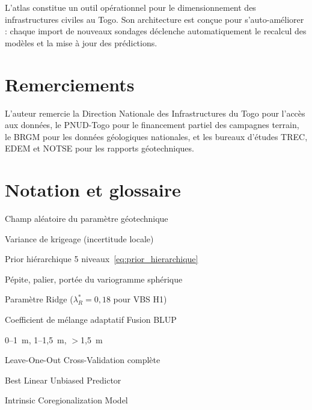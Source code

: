 \documentclass[10pt,a4paper,twocolumn]{article}
\newcommand{\bs}{\mathbf{s}}
\begin{document}
L'atlas constitue un outil opérationnel pour le dimensionnement des
infrastructures civiles au Togo. Son architecture est conçue pour
s'auto-améliorer : chaque import de nouveaux sondages déclenche
automatiquement le recalcul des modèles et la mise à jour des prédictions.

\section*{Remerciements}

L'auteur remercie la Direction Nationale des Infrastructures du Togo pour
l'accès aux données, le PNUD-Togo pour le financement partiel des campagnes
terrain, le BRGM pour les données géologiques nationales, et les bureaux
d'études TREC, EDEM et NOTSE pour les rapports géotechniques.

\printbibliography

\appendix

\section{Notation et glossaire}
\label{app:notation}

\begin{description}[noitemsep]
  \item[$Z(\bs)$] Champ aléatoire du paramètre géotechnique
  \item[$\sigma^2_K(\bs_0)$] Variance de krigeage (incertitude locale)
  \item[$\mu_h(\bs)$] Prior hiérarchique 5 niveaux~\eqref{eq:prior_hierarchique}
  \item[$C_0, C, a$] Pépite, palier, portée du variogramme sphérique
  \item[$\lambda_R$] Paramètre Ridge ($\lambda_R^*=0{,}18$ pour VBS H1)
  \item[$\beta(\bs_0)$] Coefficient de mélange adaptatif Fusion BLUP
  \item[H1/H2/H3] 0--1~m, 1--1{,}5~m, $>$1{,}5~m
  \item[LOO-CV] Leave-One-Out Cross-Validation complète
  \item[BLUP] Best Linear Unbiased Predictor
  \item[ICM] Intrinsic Coregionalization Model
\end{description}
\end{document}
